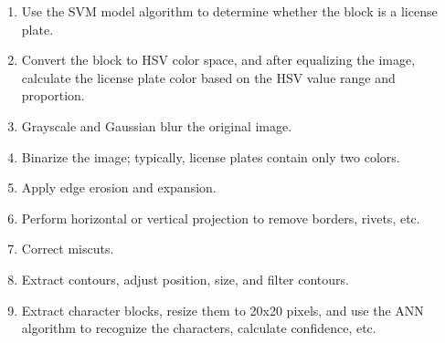 \documentclass{article}
\begin{document}
	\begin{enumerate}
		\item Use the SVM model algorithm to determine whether the block is a license plate.
		\item Convert the block to HSV color space, and after equalizing the image, calculate the license plate color based on the HSV value range and proportion.
		\item Grayscale and Gaussian blur the original image.
		\item Binarize the image; typically, license plates contain only two colors.
		\item Apply edge erosion and expansion.
		\item Perform horizontal or vertical projection to remove borders, rivets, etc.
		\item Correct miscuts.
		\item Extract contours, adjust position, size, and filter contours.
		\item Extract character blocks, resize them to 20x20 pixels, and use the ANN algorithm to recognize the characters, calculate confidence, etc.
	\end{enumerate}
	
\end{document}
